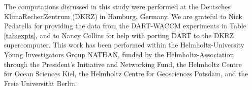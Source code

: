 The computations discussed in this study were performed at the Deutsches KlimaRechenZentrum (DKRZ) in Hamburg, Germany.
We are grateful to Nick Pedatella for providing the data from the DART-WACCM experiments in Table \ref{tab:expts}, and to
Nancy Collins for help with porting DART to the DKRZ supercomputer.
This work has been performed within the Helmholtz-University Young Investigators Group NATHAN, funded by the Helmholtz-Association through the President's Initiative and Networking Fund, the Helmholtz Centre for Ocean Sciences Kiel, the Helmholtz Centre for Geosciences Potsdam, and the Freie Universit\"at Berlin.

